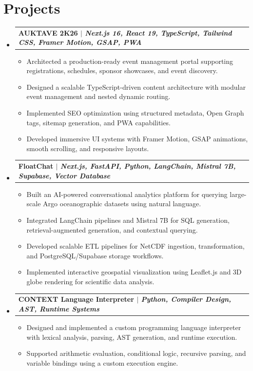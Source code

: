 \documentclass[letterpaper,10pt]{article}
\newcommand{\resumeItem}[1]{
    \item\small{#1 \vspace{-2pt}}
}
\newcommand{\resumeProjectHeading}[2]{
    \item
    \begin{tabularx}{0.97\textwidth}{Xr}
        \small\textbf{#1} & \small #2 \\
    \end{tabularx}\vspace{-7pt}
}
\newcommand{\resumeSubHeadingListStart}{\begin{itemize}[leftmargin=0.15in, label={}]}
\newcommand{\resumeSubHeadingListEnd}{\end{itemize}}
\newcommand{\resumeItemListStart}{\begin{itemize}[leftmargin=0.2in]}
\newcommand{\resumeItemListEnd}{\end{itemize}\vspace{-5pt}}
\begin{document}
\section{Projects}

\resumeSubHeadingListStart

\resumeProjectHeading
{AUKTAVE 2K26 $|$ \emph{Next.js 16, React 19, TypeScript, Tailwind CSS, Framer Motion, GSAP, PWA}}{}

\resumeItemListStart
    \resumeItem{Architected a production-ready event management portal supporting registrations, schedules, sponsor showcases, and event discovery.}
    \resumeItem{Designed a scalable TypeScript-driven content architecture with modular event management and nested dynamic routing.}
    \resumeItem{Implemented SEO optimization using structured metadata, Open Graph tags, sitemap generation, and PWA capabilities.}
    \resumeItem{Developed immersive UI systems with Framer Motion, GSAP animations, smooth scrolling, and responsive layouts.}
\resumeItemListEnd

\resumeProjectHeading
{FloatChat $|$ \emph{Next.js, FastAPI, Python, LangChain, Mistral 7B, Supabase, Vector Database}}{}

\resumeItemListStart
    \resumeItem{Built an AI-powered conversational analytics platform for querying large-scale Argo oceanographic datasets using natural language.}
    \resumeItem{Integrated LangChain pipelines and Mistral 7B for SQL generation, retrieval-augmented generation, and contextual querying.}
    \resumeItem{Developed scalable ETL pipelines for NetCDF ingestion, transformation, and PostgreSQL/Supabase storage workflows.}
    \resumeItem{Implemented interactive geospatial visualization using Leaflet.js and 3D globe rendering for scientific data analysis.}
\resumeItemListEnd

\resumeProjectHeading
{CONTEXT Language Interpreter $|$ \emph{Python, Compiler Design, AST, Runtime Systems}}{}

\resumeItemListStart
    \resumeItem{Designed and implemented a custom programming language interpreter with lexical analysis, parsing, AST generation, and runtime execution.}
    \resumeItem{Supported arithmetic evaluation, conditional logic, recursive parsing, and variable bindings using a custom execution engine.}
\resumeItemListEnd

\resumeSubHeadingListEnd

\vspace{-2pt}

\end{document}
